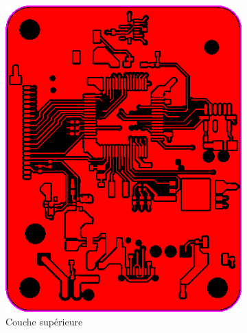\documentclass{article}
\begin{document}
\begin{figure}[h!]
    \centering
    \begin{subfigure}{0.40\textwidth}
        \centering
        \includegraphics[width=\textwidth]{image/TopLayer.png}
        \caption{Couche supérieure}
        \label{fig:apex_top_layer}
    \end{subfigure}
    \begin{subfigure}{0.40\textwidth}
        \centering

\end{subfigure}
\end{figure}
\end{document}
